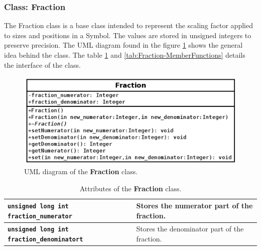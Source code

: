 \documentclass[11pt,twoside,openany,x11names,svgnames]{memoir}
\begin{document}
\clearpage

\subsubsection{Class: Fraction}\label{Class-Fraction}

The Fraction class is a base class intended to represent the scaling factor applied to sizes and positions in a Symbol. The values are stored in unsigned integers to preserve precision. The UML diagram found in the figure \ref{fig:class-fraction} shows the general idea behind the class. The table \ref{tab:Fraction-Attributes} and \ref{tab:Fraction-MemberFunctions} details the interface of the class.

\begin{figure}
	\centering
	\includegraphics[scale=0.5, clip=true, trim= 0pt 0pt 0pt 0pt]{images/chapter03-image14}
	\caption{UML diagram of the \textbf{Fraction} class.}
	\label{fig:class-fraction}
\end{figure}

\begin{table}[h]\footnotesize
\centering
\begin{tabular}{| >{\bfseries}p{5.5cm} | p{10cm} |}
	\hline
	
	\texttt{unsigned long int fraction\_numerator} & Stores the numerator part of the fraction. \\
	
	\hline
	
	\texttt{unsigned long int fraction\_denominatort} & Stores the denominator part of the fraction. \\
	
	\hline
\end{tabular}
\caption{Attributes of the \textbf{Fraction} class.}
\label{tab:Fraction-Attributes}
\end{table}
\end{document}
